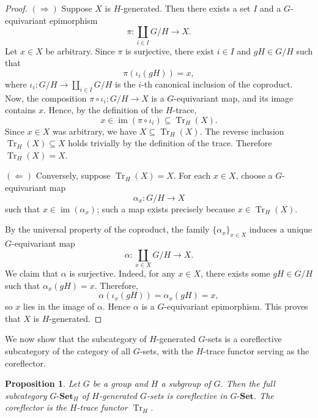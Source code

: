 \documentclass[10pt,a4paper]{amsart}
\newtheorem{proposition}{Proposition}
\begin{document}
\begin{proof}
$(\Rightarrow)$ Suppose $X$ is $H$-generated. Then there exists a set $I$ and a $G$-equivariant epimorphism
\[
\pi \colon \coprod_{i \in I} G/H \longrightarrow X.
\]
Let $x \in X$ be arbitrary. Since $\pi$ is surjective, there exist $i \in I$ and $gH \in G/H$ such that
\[
\pi(\iota_i(gH)) = x,
\]
where $\iota_i \colon G/H \longrightarrow \coprod_{i \in I} G/H$ is the $i$-th canonical inclusion of the coproduct.
Now, the composition $\pi \circ \iota_i \colon G/H \longrightarrow X$ is a $G$-equivariant map, and its image contains $x$. Hence, by the definition of the $H$-trace,
\[
x \in \operatorname{im}(\pi \circ \iota_i) \subseteq \operatorname{Tr}_H(X).
\]
Since $x \in X$ was arbitrary, we have $X \subseteq \operatorname{Tr}_H(X)$. The reverse inclusion $\operatorname{Tr}_H(X) \subseteq X$ holds trivially by the definition of the trace. Therefore $\operatorname{Tr}_H(X) = X$.

$(\Leftarrow)$ Conversely, suppose $\operatorname{Tr}_H(X) = X$. For each $x \in X$, choose a $G$-equivariant map
\[
\alpha_x \colon G/H \longrightarrow X
\]
such that $x \in \operatorname{im}(\alpha_x)$; such a map exists precisely because $x \in \operatorname{Tr}_H(X)$.

By the universal property of the coproduct, the family $\{\alpha_x\}_{x \in X}$ induces a unique $G$-equivariant map
\[
\alpha \colon \coprod_{x \in X} G/H \longrightarrow X.
\]
We claim that $\alpha$ is surjective. Indeed, for any $x \in X$, there exists some $gH \in G/H$ such that $\alpha_x(gH) = x$. Therefore,
\[
\alpha(\iota_x(gH)) = \alpha_x(gH) = x,
\]
so $x$ lies in the image of $\alpha$. Hence $\alpha$ is a $G$-equivariant epimorphism. This proves that $X$ is $H$-generated.
\end{proof}

We now show that the subcategory of $H$-generated $G$-sets is a coreflective subcategory of the category of all $G$-sets, with the $H$-trace functor serving as the coreflector.

\begin{proposition}\label{prop:tr_coreflector}
Let $G$ be a group and $H$ a subgroup of $G$. Then the full subcategory $G\text{-}\mathbf{Set}_H$ of $H$-generated $G$-sets is coreflective in $G\text{-}\mathbf{Set}$. The coreflector is the $H$-trace functor $\operatorname{Tr}_H$.
\end{proposition}
\end{document}
